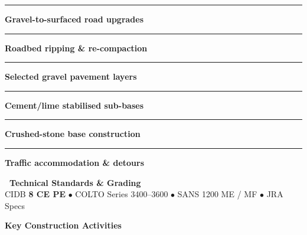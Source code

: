 \documentclass[a4paper,11pt]{article}
\begin{document}
\begin{minipage}[t]{0.34\textwidth}
    \vspace{0pt}
    \begin{tcolorbox}[
        enhanced, colback=mhoffwhite, colframe=mhnavy, boxrule=0.9pt, arc=4pt,
        title={\bfseries\color{white}\faRoad\ Scope of Work},
        colbacktitle=mhnavy, left=7pt, right=7pt, top=5pt, bottom=5pt, drop shadow=black!5
    ]
        \fontsize{7.8pt}{10.8pt}\selectfont
        \textcolor{mhnavy}{\rule{3.5pt}{3.5pt}}\hspace{4pt}\textbf{Gravel-to-surfaced road upgrades}\\
        \textcolor{mhnavy}{\rule{3.5pt}{3.5pt}}\hspace{4pt}\textbf{Roadbed ripping \& re-compaction}\\
        \textcolor{mhnavy}{\rule{3.5pt}{3.5pt}}\hspace{4pt}\textbf{Selected gravel pavement layers}\\
        \textcolor{mhnavy}{\rule{3.5pt}{3.5pt}}\hspace{4pt}\textbf{Cement/lime stabilised sub-bases}\\
        \textcolor{mhnavy}{\rule{3.5pt}{3.5pt}}\hspace{4pt}\textbf{Crushed-stone base construction}\\
        \textcolor{mhnavy}{\rule{3.5pt}{3.5pt}}\hspace{4pt}\textbf{Traffic accommodation \& detours}
    \end{tcolorbox}

    \vspace{0.12cm}

    \begin{tcolorbox}[
        enhanced, colback=white, colframe=mhlightgray, boxrule=0.8pt, arc=4pt,
        left=6pt, right=6pt, top=5pt, bottom=5pt, drop shadow=black!3
    ]
        {\fontsize{7.5pt}{9.6pt}\selectfont\bfseries\color{mhnavy}\faCheckDouble\ Technical Standards \& Grading}\\[2pt]
        {\fontsize{7.3pt}{9.4pt}\selectfont\color{mhtextmuted}
        CIDB \textbf{8 CE PE} $\bullet$ COLTO Series 3400--3600 $\bullet$ SANS 1200 ME / MF $\bullet$ JRA Specs}
    \end{tcolorbox}
\end{minipage}

\vfill

{\large\bfseries\color{mhnavy} Key Construction Activities}
\vspace{0.10cm}
\end{document}
